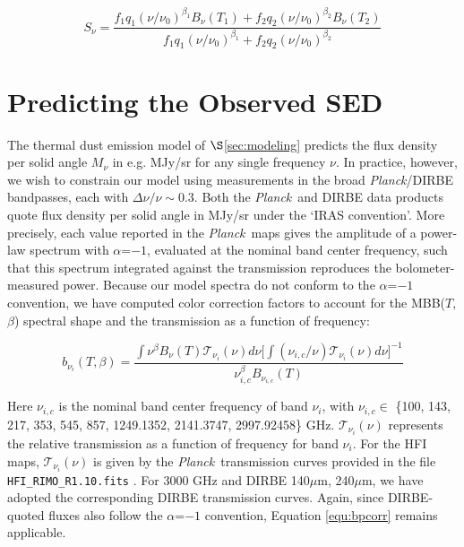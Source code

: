 \documentclass{emulateapj}
\newcommand{\PLANCK}{{\it Planck}}
\begin{document}
\begin{equation}
\label{eqn:source}
S_{\nu} = \frac{f_1q_1(\nu/\nu_0)^{\beta_1}B_{\nu}(T_1) + f_2q_2(\nu/\nu_0)^{\beta_2}B_{\nu}(T_2)}{f_1q_1(\nu/\nu_0)^{\beta_1}+f_2q_2(\nu/\nu_0)^{\beta_2}}
\end{equation}

\section{Predicting the Observed SED}
\label{sec:bpcorr}

The thermal dust emission model of $\S$\ref{sec:modeling} predicts the 
flux density per solid angle $M_{\nu}$ in e.g. MJy/sr for any single frequency 
$\nu$. In practice, however, we wish to constrain our model using measurements 
in the broad \PLANCK/DIRBE bandpasses, each with $\Delta\nu/\nu\sim0.3$. 
Both the \PLANCK~and DIRBE data products quote flux density per solid 
angle in MJy/sr under the `IRAS convention'. More precisely, each value 
reported in the \PLANCK~maps gives the amplitude of a power-law spectrum 
with $\alpha$=$-1$, evaluated at the nominal band center frequency, such that 
this spectrum integrated against the transmission reproduces the 
bolometer-measured power. Because our model spectra do not conform to the 
$\alpha$=$-1$ convention, we have computed color correction factors to account 
for the MBB($T$, $\beta$) spectral shape and the transmission as a function of 
frequency:


\begin{equation} \label{equ:bpcorr}
b_{\nu_i}(T, \beta) = \frac{\int \nu^{\beta}B_{\nu}(T)\mathcal{T}_{\nu_i}(\nu) d\nu \bigg[\int (\nu_{i,c}/\nu)\mathcal{T}_{\nu_i}(\nu) d\nu\bigg]^{-1}}{\nu_{i,c}^{\beta}B_{\nu_{i,c}}(T)}
\end{equation}


Here $\nu_{i,c}$ is the nominal band center frequency of band $\nu_i$,  with 
$\nu_{i,c} \in$ \{100, 143, 217, 353, 545, 857, 1249.1352, 2141.3747, 
2997.92458\} GHz. $\mathcal{T}_{\nu_i}(\nu)$ represents the relative 
transmission as a function of frequency for band $\nu_i$. For the HFI maps, 
$\mathcal{T}_{\nu_i}(\nu)$ is given by the \PLANCK~transmission curves provided
in the file \verb|HFI_RIMO_R1.10.fits| \citep{planckresponse}. For 3000 GHz and
DIRBE 140$\mu$m, 240$\mu$m, we have adopted the corresponding DIRBE 
transmission curves. Again, since DIRBE-quoted fluxes also follow the 
$\alpha$=$-1$ convention, Equation \ref{equ:bpcorr} remains applicable.
\end{document}
